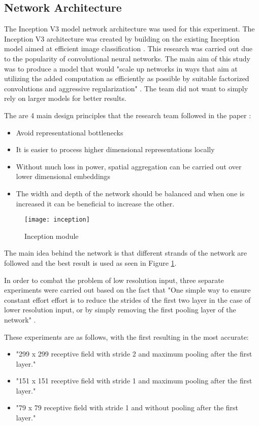 \subsection*{Network Architecture}
The Inception V3 model network architecture was used for this experiment. The
Inception V3 architecture was created by building on the existing Inception
model aimed at efficient image classification \textcite{rethinkingInception}.
This research was carried out due to the popularity of convolutional neural networks.
The main aim of this study was to produce a model that would "scale up networks in ways that aim at utilizing the added computation as efficiently as possible by suitable factorized convolutions and aggressive regularization" \textcite{rethinkingInception}.
The team did not want to simply rely on larger models for better results.

The are 4 main design principles that the research team followed in the paper \textcite{rethinkingInception}:
\begin{itemize}
    \item{Avoid representational bottlenecks}
    \item{It is easier to process higher dimensional representations locally}
    \item{Without much loss in power, spatial aggregation can be carried out over lower dimensional embeddings}
    \item{The width and depth of the network should be balanced and when one is increased it can be beneficial to increase the other.}
\end{itemize}

\begin{figure}
     \texttt{[image: inception]}
     \caption{Inception module}
     \label{fig:inception}
\end{figure}

The main idea behind the network is that different strands of the network are followed and the best result is used as seen in Figure \ref{fig:inception}.

In order to combat the problem of low resolution input, three separate experiments were carried out based on the fact that "One simple way to ensure constant effort effort is to reduce the strides of the first two layer in the case of lower resolution input, or by simply removing the first pooling layer of the network" \textcite{rethinkingInception}.

These experiments are as follows, with the first resulting in the most accurate:
\begin{itemize}
    \item{"299 x 299 receptive field with stride 2 and maximum pooling after the first layer." \textcite{rethinkingInception}}
    \item{"151 x 151 receptive field with stride 1 and maximum pooling after the first layer." \textcite{rethinkingInception}}
    \item{"79 x 79 receptive field with stride 1 and without pooling after the first layer." \textcite{rethinkingInception}}
\end{itemize}

